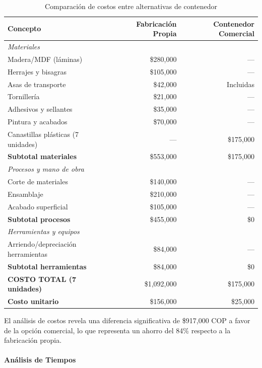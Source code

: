 \begin{table}[H]
\centering
\caption{Comparación de costos entre alternativas de contenedor}
\label{tab:costos_contenedor}
\begin{tabular}{|l|r|r|}
\hline
\textbf{Concepto} & \textbf{Fabricación Propia} & \textbf{Contenedor Comercial} \\
\hline
\hline
\multicolumn{3}{|l|}{\textit{Materiales}} \\
\hline
Madera/MDF (láminas) & \$280,000 & --- \\
Herrajes y bisagras & \$105,000 & --- \\
Asas de transporte & \$42,000 & Incluidas \\
Tornillería & \$21,000 & --- \\
Adhesivos y sellantes & \$35,000 & --- \\
Pintura y acabados & \$70,000 & --- \\
Canastillas plásticas (7 unidades) & --- & \$175,000 \\
\hline
\textbf{Subtotal materiales} & \$553,000 & \$175,000 \\
\hline
\hline
\multicolumn{3}{|l|}{\textit{Procesos y mano de obra}} \\
\hline
Corte de materiales & \$140,000 & --- \\
Ensamblaje & \$210,000 & --- \\
Acabado superficial & \$105,000 & --- \\
\hline
\textbf{Subtotal procesos} & \$455,000 & \$0 \\
\hline
\hline
\multicolumn{3}{|l|}{\textit{Herramientas y equipos}} \\
\hline
Arriendo/depreciación herramientas & \$84,000 & --- \\
\hline
\textbf{Subtotal herramientas} & \$84,000 & \$0 \\
\hline
\hline
\textbf{COSTO TOTAL (7 unidades)} & \$1,092,000 & \$175,000 \\
\textbf{Costo unitario} & \$156,000 & \$25,000 \\
\hline
\end{tabular}
\end{table}

El análisis de costos revela una diferencia significativa de \$917,000 COP a favor de la opción comercial, lo que representa un ahorro del 84\% respecto a la fabricación propia.

\paragraph{Análisis de Tiempos}


